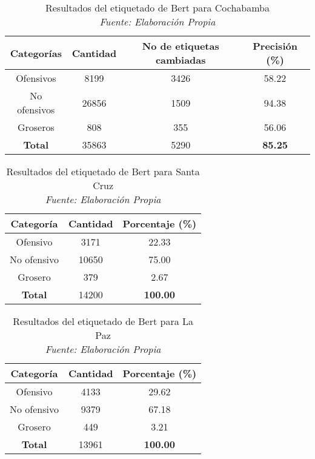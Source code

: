 \begin{itemize}
\begin{table}[!ht]
	\centering
	\begin{tabular}{|c|c|c|c|}
		\hline
		\textbf{Categorías} & \textbf{Cantidad} & \textbf{No de etiquetas cambiadas} & \textbf{Precisión (\%)} \\ \hline
		Ofensivos & 8199 & 3426 & 58.22 \\ 
		No ofensivos & 26856 & 1509 & 94.38 \\ 
		Groseros & 808 & 355 & 56.06 \\ \hline
		\textbf{Total} & 35863 & 5290 & \textbf{85.25} \\ \hline
	\end{tabular}
	\caption[Resultados del etiquetado de Bert para Cochabamba]{Resultados del etiquetado de Bert para Cochabamba
		\\\textit{Fuente: Elaboración Propia}}
	\label{tbl:cochabamba}
\end{table}

\begin{table}[!ht]
	\centering
	\begin{tabular}{|c|c|c|}
		\hline
		\textbf{Categoría} & \textbf{Cantidad} & \textbf{Porcentaje (\%)} \\ \hline
		Ofensivo & 3171 & 22.33 \\ 
		No ofensivo & 10650 & 75.00 \\ 
		Grosero & 379 & 2.67 \\ \hline
		\textbf{Total} & 14200 & \textbf{100.00} \\ \hline
	\end{tabular}
	\caption[Resultados del etiquetado de Bert para Santa Cruz]{Resultados del etiquetado de Bert para Santa Cruz
		\\\textit{Fuente: Elaboración Propia}}
	\label{tbl:santacruz}
\end{table}


\begin{table}[!ht]
	\centering
	\begin{tabular}{|c|c|c|}
		\hline
		\textbf{Categoría} & \textbf{Cantidad} & \textbf{Porcentaje (\%)} \\ \hline
		Ofensivo & 4133 & 29.62 \\ 
		No ofensivo & 9379 & 67.18 \\ 
		Grosero & 449 & 3.21 \\ \hline
		\textbf{Total} & 13961 & \textbf{100.00} \\ \hline
	\end{tabular}
	\caption[Resultados del etiquetado de Bert para La Paz]{Resultados del etiquetado de Bert para La Paz
		\\\textit{Fuente: Elaboración Propia}}
	\label{tbl:lapaz}
\end{table}


\end{itemize}
